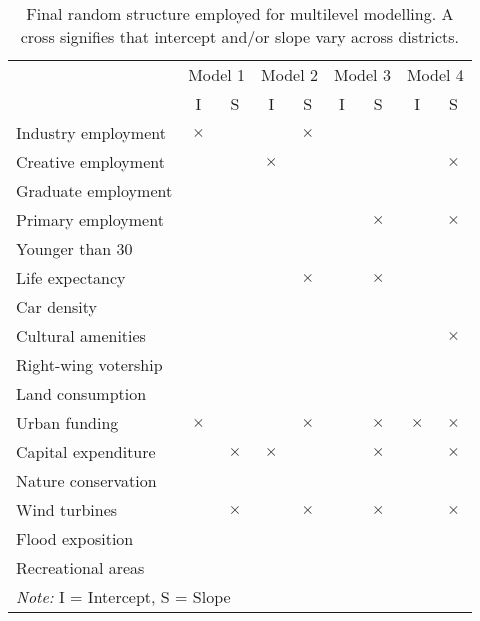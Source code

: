 \begin{table}

\caption[Final random structured employed for multilevel modelling]{\label{tab:random_structure}Final random structure employed for multilevel modelling. A cross signifies that intercept and/or slope vary across districts.}
\centering
\begin{tabular}[t]{>{}l|c>{}c|c>{}c|c>{}c|c>{}c|}
\toprule
\multicolumn{1}{c}{ } & \multicolumn{2}{c}{Model 1} & \multicolumn{2}{c}{Model 2} & \multicolumn{2}{c}{Model 3} & \multicolumn{2}{c}{Model 4} \\
\cmidrule(l{3pt}r{3pt}){2-3} \cmidrule(l{3pt}r{3pt}){4-5} \cmidrule(l{3pt}r{3pt}){6-7} \cmidrule(l{3pt}r{3pt}){8-9}
 & I & S & I & S & I & S & I & S\\
\midrule
Industry employment & $\times$ &  &  & $\times$ &  &  &  & \\
Creative employment &  &  & $\times$ &  &  &  &  & $\times$\\
Graduate employment &  &  &  &  &  &  &  & \\
Primary employment &  &  &  &  &  & $\times$ &  & $\times$\\
Younger than 30 &  &  &  &  &  &  &  & \\
Life expectancy &  &  &  & $\times$ &  & $\times$ &  & \\
Car density &  &  &  &  &  &  &  & \\
Cultural amenities &  &  &  &  &  &  &  & $\times$\\
Right-wing votership &  &  &  &  &  &  &  & \\
Land consumption &  &  &  &  &  &  &  & \\
Urban funding & $\times$ &  &  & $\times$ &  & $\times$ & $\times$ & $\times$\\
Capital expenditure &  & $\times$ & $\times$ &  &  & $\times$ &  & $\times$\\
Nature conservation &  &  &  &  &  &  &  & \\
Wind turbines &  & $\times$ &  & $\times$ &  & $\times$ &  & $\times$\\
Flood exposition &  &  &  &  &  &  &  & \\
Recreational areas &  &  &  &  &  &  &  & \\
\bottomrule
\multicolumn{9}{l}{\rule{0pt}{1em}\textit{Note: } I = Intercept, S = Slope}\\
\end{tabular}
\end{table}